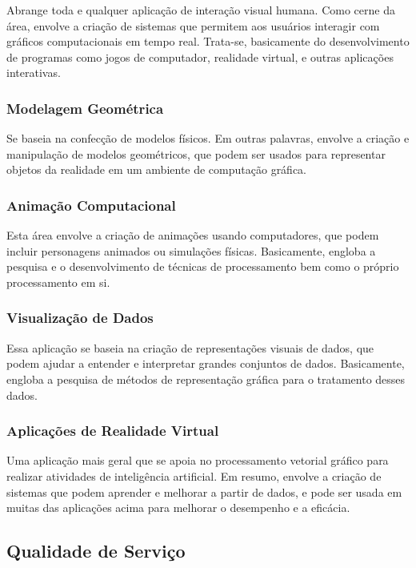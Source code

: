 Abrange toda e qualquer aplicação de interação visual humana. Como cerne da área, envolve a criação de sistemas que permitem aos usuários interagir com gráficos computacionais em tempo real. Trata-se, basicamente do desenvolvimento de programas como jogos de computador, realidade virtual, e outras aplicações interativas.

\subsubsection{Modelagem Geométrica}

Se baseia na confecção de modelos físicos. Em outras palavras, envolve a criação e manipulação de modelos geométricos, que podem ser usados para representar objetos da realidade em um ambiente de computação gráfica.

\subsubsection{Animação Computacional}

Esta área envolve a criação de animações usando computadores, que podem incluir personagens animados ou simulações físicas. Basicamente, engloba a pesquisa e o desenvolvimento de técnicas de processamento bem como o próprio processamento em si.

\subsubsection{Visualização de Dados}

Essa aplicação se baseia na criação de representações visuais de dados, que podem ajudar a entender e interpretar grandes conjuntos de dados. Basicamente, engloba a pesquisa de métodos de representação gráfica para o tratamento desses dados.

\subsubsection{Aplicações de Realidade Virtual}

Uma aplicação mais geral que se apoia no processamento vetorial gráfico para realizar atividades de inteligência artificial. Em resumo, envolve a criação de sistemas que podem aprender e melhorar a partir de dados, e pode ser usada em muitas das aplicações acima para melhorar o desempenho e a eficácia.



\subsection{Qualidade de Serviço}


